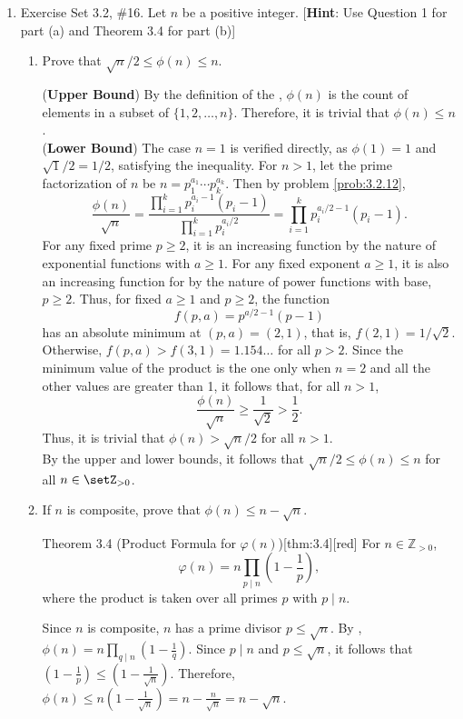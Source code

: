 \begin{enumerate}
  \newpage
  \item Exercise Set 3.2, \#16.
  Let $n$ be a positive integer.
  [\textbf{Hint}: Use Question 1 for part (a) and Theorem 3.4 for part (b)]
  \begin{enumerate}
    \item Prove that $\sqrt{n} / 2 \leq \phi(n) \leq n$.
    \begin{subprove}
      (\textbf{Upper Bound}) By the definition of the ,
      $\phi(n)$ is the count of elements in a subset of $\{1, 2, \ldots, n\}$.
      Therefore, it is trivial that $\phi(n) \leq n$.\vspace*{10px}\\
      (\textbf{Lower Bound}) The case $n=1$ is verified directly, as $\phi(1) = 1$ and $\sqrt{1}/2 = 1/2$,
      satisfying the inequality. For $n>1$, let the prime factorization of $n$ be $n = p_1^{a_1} \cdots p_k^{a_k}$.
      Then by problem \ref{prob:3.2.12},
      \[
        \frac{\phi(n)}{\sqrt{n}} = \frac{\prod_{i=1}^k p_i^{a_i-1}(p_i-1)}{\prod_{i=1}^k p_i^{a_i/2}} = \prod_{i=1}^k p_i^{a_i/2 - 1}(p_i-1).
      \]
      For any fixed prime $p\ge 2$, it is an increasing function by the nature of exponential functions with $a \ge 1$.
      For any fixed exponent $a \ge 1$, it is also an increasing function for by the nature of power functions with base, $p \ge 2$.
      Thus, for fixed $a \ge 1$ and $p \ge 2$, the function
      \[
        f(p,a) = p^{a/2 - 1}(p - 1)
      \]
      has an absolute minimum at $(p,a)=(2,1)$, that is, $f(2,1)=1/\sqrt{2}$. Otherwise, 
      $f(p,a) > f(3,1) = 1.154\dots$ for all $p > 2$. Since the minimum value of the product
      is the one only when $n=2$ and all the other values are greater than 1, it follows that, for all $n>1$,
      \[
        \frac{\phi(n)}{\sqrt{n}} \ge \frac{1}{\sqrt{2}} > \frac{1}{2}.
      \]
      Thus, it is trivial that $\phi(n) > \sqrt{n}/2$ for all $n>1$.\vspace*{10px}\\
      By the upper and lower bounds, it follows that $\sqrt{n}/2 \leq \phi(n) \leq n$ for all $n \in \setZ_{>0}$.
    \end{subprove}
    \item If $n$ is composite, prove that $\phi(n) \leq n-\sqrt{n}$.
    \begin{define}{Theorem 3.4 (Product Formula for $\varphi(n)$)}[thm:3.4][red]
    For $n \in \mathbb{Z}_{>0}$,
    \[
    \varphi(n)=n \prod_{p \mid n}\left(1-\frac{1}{p}\right),
    \]
    where the product is taken over all primes $p$ with $p \mid n$.
    \end{define}
    \begin{subprove}
      Since $n$ is composite, $n$ has a prime divisor $p \leq \sqrt{n}$.
      By , $\phi(n) = n\prod_{q\mid n}(1-\frac{1}{q})$.
      Since $p \mid n$ and $p \leq \sqrt{n}$, it follows that $(1-\frac{1}{p}) \leq (1-\frac{1}{\sqrt{n}})$.
      Therefore, $\phi(n) \leq n(1-\frac{1}{\sqrt{n}}) = n - \frac{n}{\sqrt{n}} = n - \sqrt{n}$.
    \end{subprove}
  \end{enumerate}
\end{enumerate}
